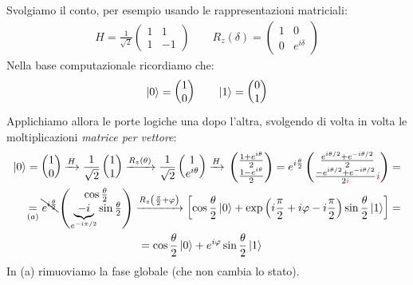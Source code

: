 \documentclass[../../InformazioneQuantistica.tex]{subfiles}
\begin{document}
Svolgiamo il conto, per esempio usando le rappresentazioni matriciali:
\begin{align*}
H = \frac{1}{\sqrt{2}}\begin{pmatrix}
1 & 1\\
1 & -1
\end{pmatrix} \qquad R_z(\delta)= \begin{pmatrix} 1 & 0\\ 0 & e^{i\delta} \end{pmatrix}
\end{align*}
Nella base computazionale ricordiamo che:
\begin{align*}
\Ket{0} = \begin{pmatrix}1 \\ 0 \end{pmatrix} \qquad \Ket{1} = \begin{pmatrix}0 \\ 1 \end{pmatrix}
\end{align*}
Applichiamo allora le porte logiche una dopo l'altra, svolgendo di volta in volta le moltiplicazioni \textit{matrice per vettore}:
\begin{align*}
\ket{0} = \begin{pmatrix} 1 \\ 0 \end{pmatrix} \xrightarrow{H}{} \frac{1}{\sqrt{2}}\begin{pmatrix}1\\1\end{pmatrix}\xrightarrow{R_z(\theta)}{} \frac{1}{\sqrt{2}}\begin{pmatrix}1 \\ e^{i\theta}\end{pmatrix} \xrightarrow{H}{} \begin{pmatrix}\frac{1+e^{i\theta}}{2}\\ \frac{1-e^{i\theta}}{2}\end{pmatrix}=
e^{i\frac{\theta}{2}} \begin{pmatrix}
\frac{e^{i\theta/2}+e^{-i\theta/2}}{2}\\
\frac{-e^{i\theta/2}+e^{-i\theta/2}}{2\textcolor{Red}{i}}\textcolor{Red}{i}
\end{pmatrix}=\\
\underset{(a)}{=}
\bcancel{e^{i\frac{\theta}{2}}}\begin{pmatrix}
\cos\frac{\theta}{2}\\\smash[t]{\underbrace{-i}_{e^{-i\pi/2}}}\sin\frac{\theta}{2}
\end{pmatrix} \xrightarrow{R_z\left(\frac{\pi}{2}+\varphi\right)} \left[ \cos\frac{\theta}{2}\ket{0} + \exp\left(i\frac{\pi}{2} +i\varphi -i\frac{\pi}{2}\right)\sin\frac{\theta}{2} \ket{1}\right] =\\
= \cos\frac{\theta}{2}\ket{0} + e^{i\varphi}\sin\frac{\theta}{2}\ket{1}\span
\end{align*}
In (a) rimuoviamo la fase globale (che non cambia lo stato).
\end{document}
